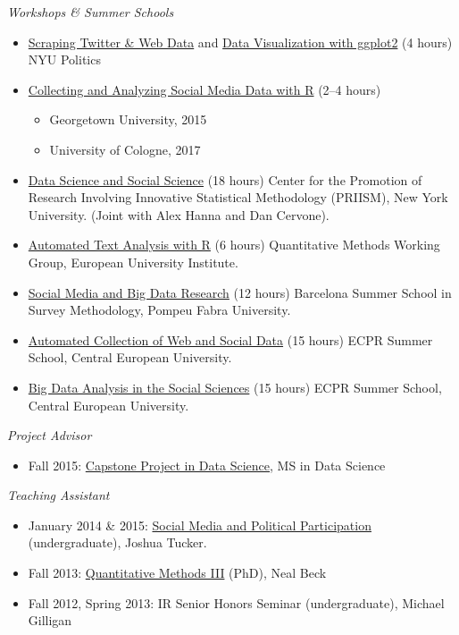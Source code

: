 \documentclass[margin,line,11pt]{resume}
\begin{document}
\begin{resume}
\emph{Workshops \& Summer Schools}
\begin{itemize}
\item \href{https://github.com/pablobarbera/workshop}{Scraping Twitter \& Web Data} and \href{https://github.com/pablobarbera/Rdataviz}{Data Visualization with ggplot2} (4 hours) NYU Politics
\item \href{https://github.com/pablobarbera/social-media-workshop}{Collecting and Analyzing Social Media Data with R} (2--4 hours)
\begin{itemize}
\vspace{-.1cm}
\item Georgetown University, 2015
\vspace{-.1cm}
\item University of Cologne, 2017
\end{itemize}
\item \href{https://github.com/pablobarbera/data-science-workshop}{Data Science and Social Science} (18 hours) Center for the Promotion of Research Involving Innovative Statistical Methodology (PRIISM), New York University. (Joint with Alex Hanna and Dan Cervone).
\item \href{https://github.com/pablobarbera/eui-text-workshop}{Automated Text Analysis with R} (6 hours) Quantitative Methods Working Group, European University Institute.
\item \href{https://eventum.upf.edu/event_detail/7273/sections/5650/1st-week-courses.html}{Social Media and Big Data Research} (12 hours) Barcelona Summer School in Survey Methodology, Pompeu Fabra University.
\item \href{https://ecpr.eu/Events/PanelDetails.aspx?PanelID=7055&EventID=116}{Automated Collection of Web and Social Data} (15 hours) ECPR Summer School, Central European University.
\item \href{https://ecpr.eu/Events/PanelDetails.aspx?PanelID=7061&EventID=116}{Big Data Analysis in the Social Sciences} (15 hours) ECPR Summer School, Central European University.
\end{itemize}

\emph{Project Advisor}
\begin{itemize}
\item Fall 2015: \href{http://cds.nyu.edu/academics/ms-in-data-science/curriculum/required-courses/#ds-ga-1006}{Capstone Project in Data Science}, MS in Data Science
\end{itemize}


\emph{Teaching Assistant}
\begin{itemize}
\item January 2014 \& 2015: \href{https://github.com/pablobarbera/NYU-AD-160J}{Social Media and Political Participation} (undergraduate), Joshua Tucker.
\item Fall 2013: \href{https://github.com/pablobarbera/quant3materials}{Quantitative Methods III} (PhD), Neal Beck
\item Fall 2012, Spring 2013: IR Senior Honors Seminar (undergraduate), Michael Gilligan
\end{itemize}


\end{resume}
\end{document}
